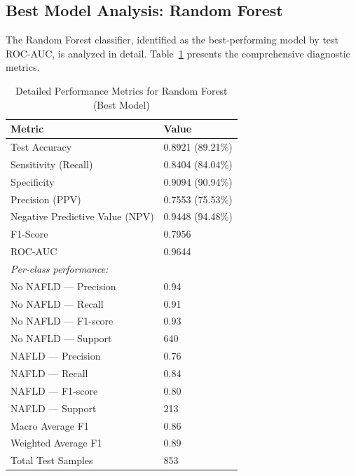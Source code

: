\documentclass[conference,10pt]{IEEEtran}
\begin{document}
\subsection{Best Model Analysis: Random Forest}
\label{subsec:best_model}

The Random Forest classifier, identified as the best-performing model by test ROC-AUC, is analyzed in detail. Table~\ref{tab:best_model_metrics} presents the comprehensive diagnostic metrics.

\begin{table}[!t]
\centering
\caption{Detailed Performance Metrics for Random Forest (Best Model)}
\label{tab:best_model_metrics}
\begin{tabular}{ll}
\toprule
\textbf{Metric} & \textbf{Value} \\
\midrule
Test Accuracy & 0.8921 (89.21\%) \\
Sensitivity (Recall) & 0.8404 (84.04\%) \\
Specificity & 0.9094 (90.94\%) \\
Precision (PPV) & 0.7553 (75.53\%) \\
Negative Predictive Value (NPV) & 0.9448 (94.48\%) \\
F1-Score & 0.7956 \\
ROC-AUC & 0.9644 \\
\midrule
\multicolumn{2}{l}{\textit{Per-class performance:}} \\
No NAFLD — Precision & 0.94 \\
No NAFLD — Recall & 0.91 \\
No NAFLD — F1-score & 0.93 \\
No NAFLD — Support & 640 \\
NAFLD — Precision & 0.76 \\
NAFLD — Recall & 0.84 \\
NAFLD — F1-score & 0.80 \\
NAFLD — Support & 213 \\
\midrule
Macro Average F1 & 0.86 \\
Weighted Average F1 & 0.89 \\
Total Test Samples & 853 \\
\bottomrule
\end{tabular}
\end{table}
\end{document}
